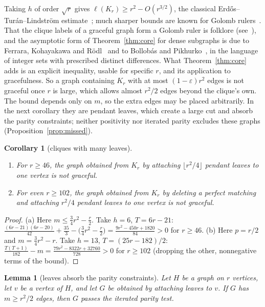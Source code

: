 \documentclass[11pt]{amsart}
\newcommand{\thmmarker}{}
\newcommand{\mgpt}{\gdef\thmmarker{\textsuperscript{$\dagger$}}}
\theoremstyle{tplain}
\newtheorem{lemma}[theorem]{Lemma}
\newtheorem{corollary}[theorem]{Corollary}
\theoremstyle{tdefinition}
\theoremstyle{tremark}
\begin{document}
Taking $h$ of order $\sqrt r$ gives $\ell(K_r)\ge r^2-O(r^{3/2})$, the classical
Erd\H{o}s--Tur\'an--Lindstr\"om estimate~\cite{et,lindstrom}; much sharper bounds
are known for Golomb rulers~\cite{cho}. That the clique labels of a graceful
graph form a Golomb ruler is folklore (see~\cite{gallian}), and the
asymptotic form of Theorem~\ref{thm:core} for dense subgraphs is due to
Ferrara, Kohayakawa and R\"odl~\cite{fkr} and to Bollob\'as and
Pikhurko~\cite{bp}, in the language of integer sets with prescribed distinct
differences. What Theorem~\ref{thm:core} adds is an explicit inequality,
usable for specific $r$, and its application to gracefulness. So a graph containing $K_r$ with at most
$(1-\varepsilon)r^2$ edges is not graceful once $r$ is large, which allows
almost $r^2/2$ edges beyond the clique's own. The bound depends only on $m$, so the extra edges may be placed
arbitrarily. In the next corollary they are pendant leaves, which create a
large cut and absorb the parity constraints; neither positivity nor
iterated parity excludes these graphs (Proposition~\ref{prop:missed}).

\mgpt\begin{corollary}[cliques with many leaves]\label{cor:leaves}
\leavevmode
\begin{enumerate}[label=(\alph*)]
\item For $r\ge46$, the graph obtained from $K_r$ by attaching
  $\lfloor r^2/4\rfloor$ pendant leaves to one vertex is not graceful.
\item For even $r\ge102$, the graph obtained from $K_r$ by deleting a perfect
  matching and attaching $r^2/4$ pendant leaves to one vertex is not graceful.
\end{enumerate}
\end{corollary}

\begin{proof}
(a) Here $m\le\frac34r^2-\frac r2$. Take $h=6$, $T=6r-21$:
$\frac{(6r-21)(6r-20)}{42}+\frac{35}3-\bigl(\frac34r^2-\frac r2\bigr)
=\frac{9r^2-450r+1820}{84}>0$ for $r\ge46$.
(b) Here $p=r/2$ and $m=\frac34r^2-r$. Take $h=13$, $T=(25r-182)/2$:
$\frac{T(T+1)}{182}-m=\frac{79r^2-8322r+32760}{728}>0$ for $r\ge102$
(dropping the other, nonnegative terms of the bound).
\end{proof}

\mgpt\begin{lemma}[leaves absorb the parity constraints]\label{lem:leaves-parity}
Let $H$ be a graph on $r$ vertices, let $v$ be a vertex of $H$, and let $G$ be
obtained by attaching leaves to $v$. If $G$ has $m\ge r^2/2$ edges, then $G$ passes the iterated parity test.
\end{lemma}
\end{document}
